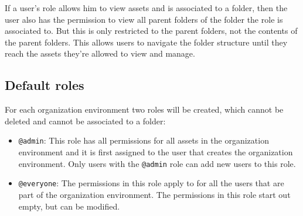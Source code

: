 
If a user's role allows him to view assets and is associated to a folder, then the user
also has the permission to view all parent folders of the folder the role is associated to.
But this is only restricted to the parent folders, not the contents of the parent folders.
This allows users to navigate the folder structure until they reach the assets they're
allowed to view and manage.


\subsection{Default roles}

For each organization environment two roles will be created, which cannot be deleted and
cannot be associated to a folder:

\begin{itemize}
  \item \lstinline{@admin}: This role has all permissions for all assets in the
    organization environment and it is first assigned to the user that creates the organization environment.
    Only users with the \lstinline{@admin} role can add new users to this role.
  \item \lstinline{@everyone}: The permissions in this role apply to for all the users
    that are part of the organization environment. The permissions in this role start out
    empty, but can be modified.
\end{itemize}

